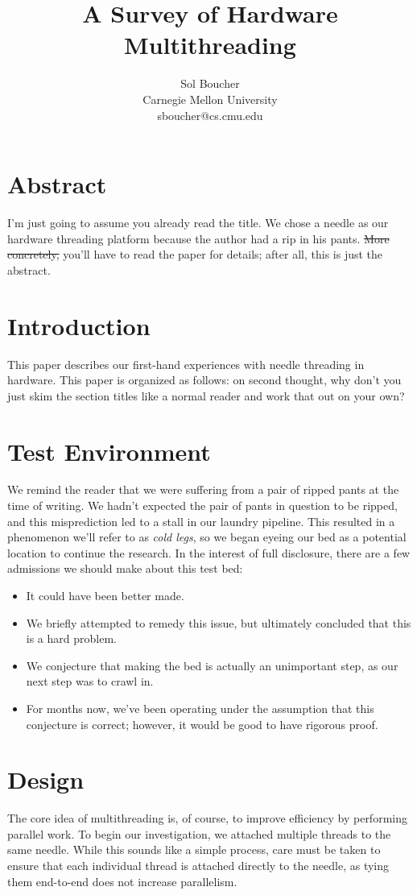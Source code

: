 \documentclass[letterpaper,12pt]{article}
\title{A Survey of Hardware Multithreading}
\author{Sol Boucher \\ Carnegie Mellon University \\ sboucher@cs.cmu.edu}
\date{}
\begin{document}
\maketitle
\thispagestyle{empty}
\begin{multicols}{2}

\section*{Abstract}
I'm just going to assume you already read the title.
We chose a needle as our hardware threading platform because the author had a rip in his pants.
\sout{More concretely,} you'll have to read the paper for details; after all, this is just the abstract.

\section{Introduction}
This paper describes our first-hand experiences with needle threading in hardware.
This paper is organized as follows:\@
on second thought, why don't you just skim the section titles like a normal reader and work that out on your own?

\section{Test Environment}
We remind the reader that we were suffering from a pair of ripped pants at the time of writing.
We hadn't expected the pair of pants in question to be ripped, and this misprediction led to a stall in our laundry pipeline.
This resulted in a phenomenon we'll refer to as \textit{cold legs}, so we began eyeing our bed as a potential location to continue the research.
In the interest of full disclosure, there are a few admissions we should make about this test bed:
\begin{itemize}
\item It could have been better made.
\item We briefly attempted to remedy this issue, but ultimately concluded that this is a hard problem.
\item We conjecture that making the bed is actually an unimportant step, as our next step was to crawl in.
\item For months now, we've been operating under the assumption that this conjecture is correct; however, it would be good to have rigorous proof.
\end{itemize}

\section{Design}
The core idea of multithreading is, of course, to improve efficiency by performing parallel work.
To begin our investigation, we attached multiple threads to the same needle.
While this sounds like a simple process, care must be taken to ensure that each individual thread is attached directly to the needle, as tying them end-to-end does not increase parallelism.


\end{multicols}
\end{document}
